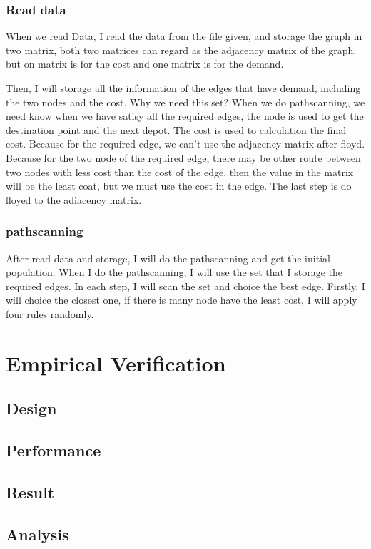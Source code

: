 \documentclass[conference,compsoc]{IEEEtran}
\begin{document}
  \subsubsection{Read data}
    When we read Data, I read the data from the file given, and storage the graph in two matrix, both two matrices can 
    regard as the adjacency matrix of the graph, but on matrix is for the cost and one matrix is for the demand.

    Then, I will storage all the information of the edges that have demand, including the two nodes and the cost. Why we need this set?
    When we do pathscanning, we need know when we have satisy all the required edges, the node is used to get the destination point and the next depot.
    The cost is used to calculation the final cost. Because for the required edge, we can't use the adjacency matrix after floyd. Because for the two node of the required edge, there may be other route between two nodes with less cost than the cost of the edge, then the value in the matrix will be the least coat, but we must use the cost in the edge.
    The last step is do floyed to the adiacency matrix.
  \subsubsection{pathscanning}
    After read data and storage, I will do the pathscanning and get the initial population.
    When I do the pathscanning, I will use the set that I storage the required edges. 
    In each step, I will scan the set and choice the best edge. Firstly, I will choice the closest one, if there is many node have the least cost, I will apply four rules randomly.
  \subsubsection{}

\section{Empirical Verification}
  \subsection{Design}

  \subsection{Performance}

  \subsection{Result}

  \subsection{Analysis}



\cite{rivest1987game}
\cite{knuth1975analysis}
\end{document}
